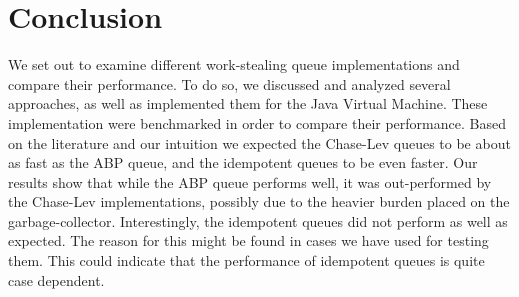 \section{Conclusion}
\label{sec:conclusion}
We set out to examine different work-stealing queue implementations and compare their performance. To do so, we discussed and analyzed several approaches, as well as implemented them for the Java Virtual Machine. These implementation were benchmarked in order to compare their performance.
Based on the literature and our intuition we expected the Chase-Lev queues to be about as fast as the ABP queue, and the idempotent queues to be even faster.
Our results show that while the ABP queue performs well, it was out-performed by the Chase-Lev implementations, possibly due to the heavier burden placed on the garbage-collector. Interestingly, the idempotent queues did not perform as well as expected. The reason for this might be found in cases we have used for testing them. This could indicate that the performance of idempotent queues is quite case dependent.
